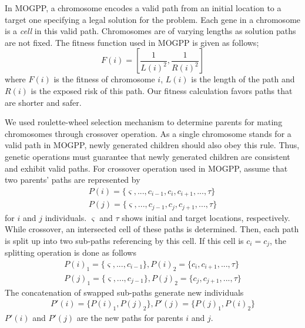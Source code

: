 \documentclass[10pt,journal]{IEEEtran}
\begin{document}
In MOGPP, a chromosome encodes a valid path from an initial location to a target one specifying a legal solution for the problem. Each gene in a chromosome is a \textit{cell} in this valid path. Chromosomes are of varying lengths as solution paths are not fixed. The fitness function used in MOGPP is given as follows; \[F(i) = [\dfrac{1}{L(i)^{2}}, \dfrac{1}{R(i)^{2}}] \] where $F(i)$ is the fitness of chromosome $i$, $L(i)$ is the length of the path and $R(i)$ is the exposed risk of this path.  Our fitness calculation favors paths that are shorter and safer. 

We used roulette-wheel selection mechanism to determine parents for mating chromosomes through crossover  operation. As a single chromosome stands for a valid path in MOGPP, newly generated children should also obey this rule. Thus, genetic operations must guarantee that newly generated children are consistent and exhibit valid paths. For crossover operation used in MOGPP, assume that two parents' paths are represented by 
\begin{gather*}
P(i)=\lbrace \varsigma, ..., c_{i-1}, c_{i}, c_{i+1}, ..., \tau \rbrace \\
P(j)=\lbrace \varsigma, ..., c_{j-1}, c_{j}, c_{j+1}, ..., \tau \rbrace
\end{gather*}
for $i$ and $j$ individuals. $\varsigma$ and $\tau$ shows initial and target locations, respectively. While crossover, an intersected cell of these paths is determined. Then, each path is split up into two sub-paths referencing by this cell. If this cell is $c_{i} = c_{j}$, the splitting operation is done as follows
\begin{gather*}
P(i)_{1}=\lbrace \varsigma, ..., c_{i-1} \rbrace, 
P(i)_{2}=\lbrace c_{i}, c_{i+1}, ..., \tau \rbrace \\
P(j)_{1}=\lbrace \varsigma, ..., c_{j-1} \rbrace, 
P(j)_{2}=\lbrace c_{j}, c_{j+1}, ..., \tau \rbrace
\end{gather*}
The concatenation of swapped sub-paths generate new individuals
\begin{gather*}
P'(i)=\lbrace P(i)_{1}, P(j)_{2} \rbrace, 
P'(j)=\lbrace P(j)_{1}, P(i)_{2} \rbrace 
\end{gather*}
$P'(i)$ and $P'(j)$ are the new paths for parents $i$ and $j$.

\end{document}
